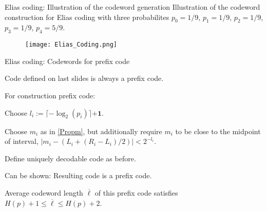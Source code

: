 \begin{frame}{Elias coding: Illustration of the codeword generation}
Illustration of the codeword construction for Elias coding with three probabilites $p_0=1/9$, $p_1=1/9$, $p_2=1/9$, $p_3=1/9$, $p_4=5/9$.  
\begin{center}
\begin{figure}
\texttt{[image: Elias\_Coding.png]}
\end{figure}
\end{center}
\end{frame}


\begin{frame}{Elias coding: Codewords for prefix code}

\bit
\item Code defined on last slides is  always a prefix code.
\item For construction prefix code: 
\bit
\item Choose $l_i:=\lceil-\log_2(p_i)\rceil\mathbf{+1}$.
\item Choose $m_i$ as in \eqref{Propm},  but additionally require $m_i$ to be close to the midpoint of interval,  $|m_i-(L_i+(R_i-L_i)/2)|<2^{-l_i}$. 
\item Define uniquely decodable code as before.
\eit
\item Can be shown: Resulting code is a prefix code.
\item Average codeword length $\overline{\ell}$ of this prefix code satisfies $H(p)+1\leq \overline{\ell}\leq H(p)+2$. 
\eit
\end{frame}


